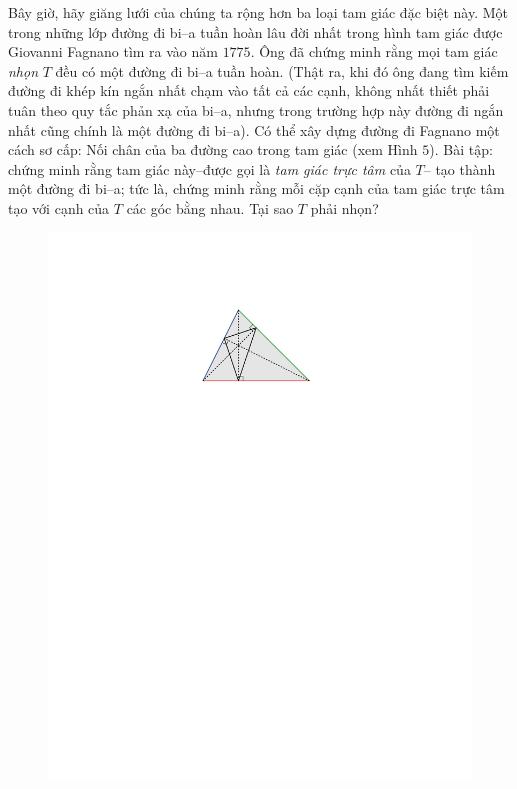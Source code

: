 	\begin{multicols}{2}
	Bây giờ, hãy giăng lưới của chúng ta rộng hơn ba loại tam giác đặc biệt này. Một trong những lớp đường đi bi--a tuần hoàn lâu đời nhất trong hình tam giác được Giovanni Fagnano tìm ra vào năm $1775$. Ông đã chứng minh rằng mọi tam giác \emph{nhọn} $T$ đều có một đường đi bi--a tuần hoàn. (Thật ra, khi đó ông  đang tìm kiếm  đường đi khép kín ngắn nhất chạm vào tất cả các cạnh, không nhất thiết phải tuân theo quy tắc phản xạ của bi--a, nhưng trong trường hợp này  đường đi ngắn nhất cũng chính là một  đường đi bi--a).
	\vskip 0.1cm
	Có thể xây dựng đường đi Fagnano một cách sơ cấp: Nối chân của ba đường cao trong tam giác (xem Hình $5$). Bài tập: chứng minh rằng
	tam giác này--được gọi là \emph{tam giác trực tâm} của $T$-- tạo thành một đường đi bi--a; tức là, chứng minh rằng mỗi cặp cạnh của
	tam giác trực tâm tạo với cạnh của $T$ các góc bằng nhau. Tại sao $T$ phải nhọn?
	\begin{figure}[H]
		\vspace*{-10pt}
		\centering
		\captionsetup{labelformat= empty, justification=centering}
		\includegraphics[width= 0.95\linewidth]{5}

\end{figure}
\end{multicols}
